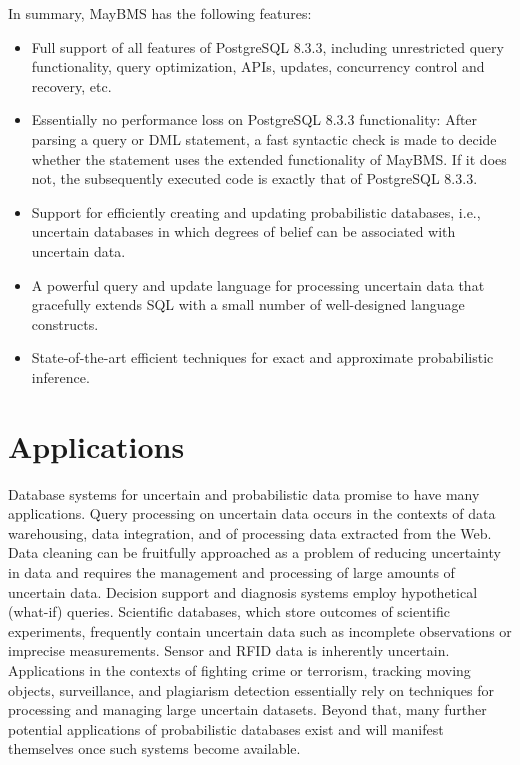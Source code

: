 \documentclass[12pt]{book}
\begin{document}
In summary, MayBMS has the following features:
\begin{itemize}
\item
Full support of all features of PostgreSQL 8.3.3, including unrestricted
query functionality, query optimization, APIs, updates, concurrency control and
recovery, etc.

\item
Essentially no performance loss on PostgreSQL 8.3.3 functionality:
After parsing a query or DML statement,
a fast syntactic check is made to decide
whether the statement uses the extended functionality of MayBMS. If it does
not, the subsequently executed code is exactly that of PostgreSQL 8.3.3.

\item
Support for efficiently creating and updating probabilistic databases,
i.e., uncertain databases in which degrees of belief can be associated
with uncertain data.

\item
A powerful query and update language for processing uncertain data
that gracefully extends SQL with a small number of well-designed
language constructs.

\item
State-of-the-art efficient techniques
for exact and approximate probabilistic inference.
\end{itemize}



\section{Applications}


Database systems for uncertain  and probabilistic data promise to have
many applications.  Query processing on  uncertain data occurs  in the
contexts of data warehousing, data integration, and of processing data
extracted from the Web. Data  cleaning can be fruitfully approached as
a problem of reducing uncertainty  in data and requires the management
and processing  of large amounts  of uncertain data.  Decision support
and   diagnosis  systems   employ   hypothetical  (what-if)   queries.
Scientific databases, which  store outcomes of scientific experiments,
frequently contain  uncertain data such as  incomplete observations or
imprecise   measurements.   Sensor  and   RFID   data  is   inherently
uncertain.  Applications   in  the  contexts  of   fighting  crime  or
terrorism,  tracking  moving  objects,  surveillance,  and  plagiarism
detection essentially  rely on techniques for  processing and managing
large  uncertain   datasets.  Beyond  that,   many  further  potential
applications  of  probabilistic  databases  exist  and  will  manifest
themselves once such systems become available.
\end{document}
